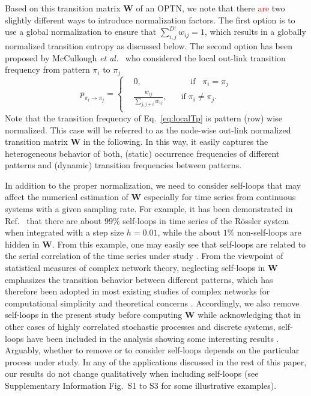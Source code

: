 \documentclass[aip,cha,reprint,nofootinbib]{revtex4-1}
\begin{document}
Based on this transition matrix $\mathbf{W}$ of an OPTN, we note that there \textcolor{red}{are} two slightly different ways to introduce normalization factors. The first option \cite{zhangSciRep2017} is to use a global normalization to ensure that $\sum_{i,j}^{D!} w_{ij} = 1$, which results in a globally normalized transition entropy as discussed below. The second option has been proposed by McCullough {\textit{et al.}}~\cite{McCullough2017b} who considered the local out-link transition frequency from pattern $\pi_i$ to $\pi_j$
\begin{equation} \label{eq:localTp}
p_{\pi_i \to \pi_j} = \left \{ \begin{aligned}
				& 0,  \;\;\;\;\;\;\;\;\;\;\;\;\;\;\;\;\;\;\;\;\; \text{if} \;\;\; \pi_i = \pi_j \\
				& \frac{w_{ij}}{\sum_{j, j \neq i} w_{ij}}, \;\;\;\;\;\; \text{if} \; \pi_i \neq \pi_j.\\
				\end{aligned}
				\right.
\end{equation}
\noindent
Note that the transition frequency of Eq.~\eqref{eq:localTp} is pattern (row) wise normalized. This case will be referred to as the node-wise out-link normalized transition matrix $\mathbf{W}$ in the following. In this way, it easily captures the heterogeneous behavior of both, (static) occurrence frequencies of different patterns and (dynamic) transition frequencies between patterns. 

In addition to the proper normalization, we need to consider self-loops that may affect the numerical estimation of $\mathbf{W}$ especially for time series from continuous systems with a given sampling rate. For example, it has been demonstrated in Ref.~\cite{zhangSciRep2017} that there are about $99\%$ self-loops in time series of the R\"ossler system when integrated with a step size $h = 0.01$, while the about $1\%$ non-self-loops are hidden in $\mathbf{W}$. From this example, one may easily see that self-loops are related to the serial correlation of the time series under study \cite{BorgesAMC2019}. {\color{red} From the viewpoint of statistical measures of complex network theory}, neglecting self-loops in $\mathbf{W}$ emphasizes the transition behavior between different patterns, which has therefore been adopted in most existing studies of complex networks for computational simplicity and theoretical concerns \cite{CostaADPhy2007}. Accordingly, we also remove self-loops in the present study before computing $\mathbf{W}$ while acknowledging that in other cases of {\color{red} highly correlated} stochastic processes and discrete systems, self-loops have been included in the analysis showing some interesting results \cite{BorgesAMC2019}. Arguably, whether to remove or to consider self-loops depends on the particular process under study. In any of the applications discussed in the rest of this paper, our results do not change qualitatively when including self-loops{\color{red} (see Supplementary Information Fig.~S1 to S3 for some illustrative examples).}
\end{document}
